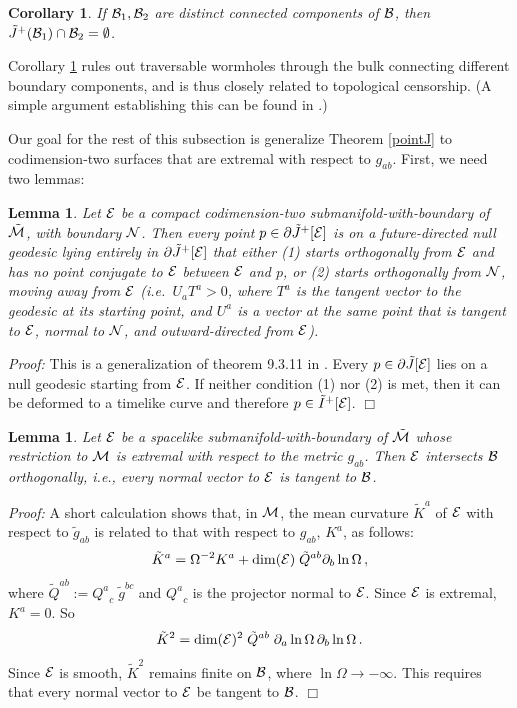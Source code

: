 \documentclass[12pt]{article}
\def\bulkJ{{\tilde J}}
\def\bulkI{{\tilde I}}
\def\bulk{{\cal M}}
\def\bdy{{\cal B}}
\def\overM{\tilde \bulk}
\newtheorem{lemma}[theorem]{Lemma}
\newtheorem{corollary}[theorem]{Corollary}
\begin{document}
\begin{corollary}\label{wormholes}If $\bdy_1,\bdy_2$ are distinct connected components of $\bdy$, then $\bulkJ^+(\bdy_1)\cap\bdy_2=\emptyset$.\end{corollary}
Corollary \ref{wormholes} rules out traversable wormholes through the bulk connecting different boundary components, and is thus closely related to topological censorship. (A simple argument establishing this can be found in \cite{Freivogel:2005qh}.)

Our goal for the rest of this subsection is generalize Theorem \ref{pointJ} to codimension-two surfaces that are extremal with respect to $g_{ab}$. First, we need two lemmas:


\begin{lemma}\label{Idot}Let ${\cal E}$ be a compact codimension-two submanifold-with-boundary of $\overM$, with boundary ${\cal N}$. Then every point $p\in\partial \bulkJ^+[{\cal E}]$ is on a future-directed null geodesic lying entirely in $\partial \bulkJ^+[{\cal E}]$ that either (1) starts orthogonally from ${\cal E}$ and has no point conjugate to ${\cal E}$ between ${\cal E}$ and $p$, or (2) starts orthogonally from ${\cal N}$, moving away from ${\cal E}$ (i.e.\ $U_aT^a>0$, where $T^a$ is the tangent vector to the geodesic at its starting point, and $U^a$ is a vector at the same point that is tangent to ${\cal E}$, normal to ${\cal N}$, and outward-directed from ${\cal E}$).\end{lemma}

\emph{Proof:} This is a generalization of theorem 9.3.11 in \cite{Wald:1984ai}. Every 
$p\in\partial \bulkJ[{\cal E}]$ lies on a null geodesic starting from ${\cal E}$. If neither condition (1) nor (2) is met, then it can be deformed to a timelike curve and therefore $p\in \bulkI^+[{\cal E}]$. $\Box$

\begin{lemma}\label{normal}Let ${\cal E}$ be a spacelike submanifold-with-boundary of $\overM$ whose restriction to $\bulk$ is extremal with respect to the metric $g_{ab}$. Then ${\cal E}$ intersects $\bdy$ orthogonally, i.e., every normal vector to ${\cal E}$ is tangent to $\bdy$.\end{lemma}

\emph{Proof:} A short calculation shows that, in $\bulk$, the mean curvature $\tilde K^a$ of 
${\cal E}$ with respect to ${\tilde g}_{ab}$ is related to that with respect to $g_{ab}$, $K^a$, as follows:
%
\begin{equation}
\tilde K^a = \Omega^{-2}K^a + \dim({\cal E})\; \tilde Q^{ab}\partial_b\ln\Omega\,,
\end{equation}
where $\tilde Q^{ab}:={Q^a}_c\; {\tilde g}^{bc}$ and ${Q^a}_c$ is the projector normal to 
${\cal E}$. Since ${\cal E}$ is extremal, $K^a=0$. So
\begin{equation}
\tilde K^2 = \dim({\cal E})^2\; {\tilde Q}^{ab}\; \partial_a\ln\Omega\,\partial_b\ln\Omega\,.
\end{equation}
%
Since ${\cal E}$ is smooth, $\tilde K^2$ remains finite on $\bdy$, where 
$\ln\Omega\to-\infty$. This requires that every normal vector to 
${\cal E}$ be tangent to $\bdy$. $\Box$
\end{document}
